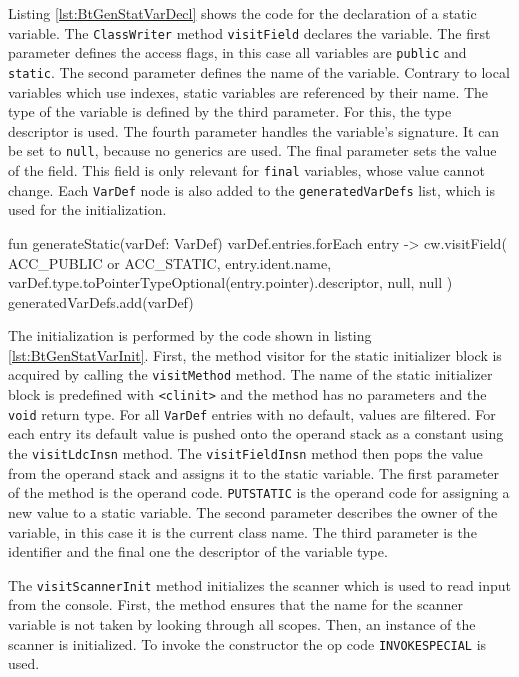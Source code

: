 Listing \ref{lst:BtGenStatVarDecl} shows the code for the declaration of a static variable. The \verb|ClassWriter| method \verb|visitField| declares the variable. The first parameter defines the access flags, in this case all variables are \verb|public| and \verb|static|. The second parameter defines the name of the variable. Contrary to local variables which use indexes, static variables are referenced by their name. The type of the variable is defined by the third parameter. For this, the type descriptor is used. The fourth parameter handles the variable's signature. It can be set to \verb|null|, because no generics are used. The final parameter sets the value of the field. This field is only relevant for \verb|final| variables, whose value cannot change. Each \verb|VarDef| node is also added to the \verb|generatedVarDefs| list, which is used for the initialization.



\begin{KotlinCode}[float,numbers=none,caption=Code for the declaration of static variables., label=lst:BtGenStatVarDecl]
fun generateStatic(varDef: VarDef) {
    varDef.entries.forEach { entry ->
        cw.visitField(
            ACC_PUBLIC
                    or ACC_STATIC,
            entry.ident.name,
            varDef.type.toPointerTypeOptional(entry.pointer).descriptor,
            null,
            null
        )
    }
    generatedVarDefs.add(varDef)
}
\end{KotlinCode}

The initialization is performed by the code shown in listing \ref{lst:BtGenStatVarInit}. First, the method visitor for the static initializer block is acquired by calling the \verb|visitMethod| method. The name of the static initializer block is predefined with \verb|<clinit>| and the method has no parameters and the \verb|void| return type. For all \verb|VarDef| entries with no default, values are filtered. For each entry its default value is pushed onto the operand stack as a constant using the \verb|visitLdcInsn| method. The \verb|visitFieldInsn| method then pops the value from the operand stack and assigns it to the static variable. The first parameter of the method is the operand code. \verb|PUTSTATIC| is the operand code for assigning a new value to a static variable. The second parameter describes the owner of the variable, in this case it is the current class name. The third parameter is the identifier and the final one the descriptor of the variable type.

The \verb|visitScannerInit| method initializes the scanner which is used to read input from the console. First, the method ensures that the name for the scanner variable is not taken by looking through all scopes. Then, an instance of the scanner is initialized. To invoke the constructor the op code \verb|INVOKESPECIAL| is used.

